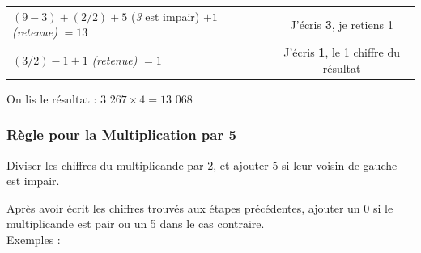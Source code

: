 \documentclass[a4paper, twoside]{article}
\begin{document}
\begin{small}
\begin{enumerate}
\begin{tabular}{l|c}
				\tabularnewline
				
				$(9 - 3) + (2 / 2) + 5$ (\textit{3} est impair) $+ 1$ \textit{(retenue)} $= 13$ & J'écris \textbf{3}, je retiens 1 
				
				\tabularnewline
				
				$(3 / 2) - 1 + 1$ \textit{(retenue)} $= 1$ & J'écris \textbf{1}, le 1\up{er} chiffre du résultat
				
			\end{tabular}
			
			On lis le résultat : {\boldmath $3$ $267 \times 4 = 13$ $068$}\\

		\end{enumerate}
		\end{small}

		\vfill

		\newpage





		\subsubsection*{Règle pour la Multiplication par 5}

		Diviser les chiffres du multiplicande par 2, et ajouter 5 si leur voisin de gauche est impair.

		Après avoir écrit les chiffres trouvés aux étapes précédentes, ajouter un 0 si le multiplicande est pair ou un 5 dans le cas contraire.\\

		{ \parindent=0.5cm Exemples : }
\end{document}
